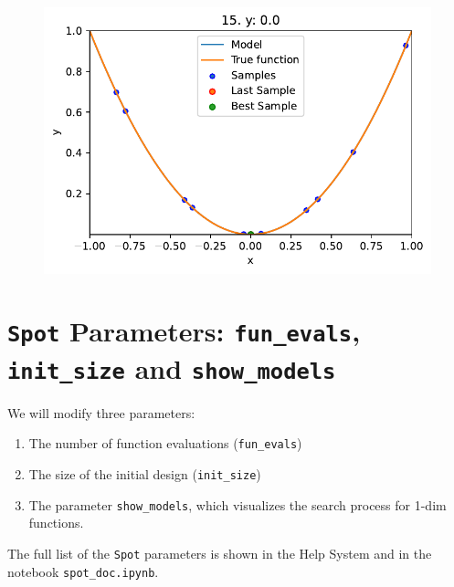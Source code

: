 \documentclass[
  letterpaper,
  DIV=11,
  numbers=noendperiod]{scrreprt}
\providecommand{\tightlist}{%
  \setlength{\itemsep}{0pt}\setlength{\parskip}{0pt}}\usepackage{longtable,booktabs,array}
\begin{document}
\begin{figure}[H]

{\centering \includegraphics{007_num_spot_intro_files/figure-pdf/cell-9-output-1.pdf}

}

\end{figure}

\hypertarget{spot-parameters-fun_evals-init_size-and-show_models}{%
\section{\texorpdfstring{\texttt{Spot} Parameters: \texttt{fun\_evals},
\texttt{init\_size} and
\texttt{show\_models}}{Spot Parameters: fun\_evals, init\_size and show\_models}}\label{spot-parameters-fun_evals-init_size-and-show_models}}

We will modify three parameters:

\begin{enumerate}
\def\labelenumi{\arabic{enumi}.}
\tightlist
\item
  The number of function evaluations (\texttt{fun\_evals})
\item
  The size of the initial design (\texttt{init\_size})
\item
  The parameter \texttt{show\_models}, which visualizes the search
  process for 1-dim functions.
\end{enumerate}

The full list of the \texttt{Spot} parameters is shown in the Help
System and in the notebook \texttt{spot\_doc.ipynb}.
\end{document}

